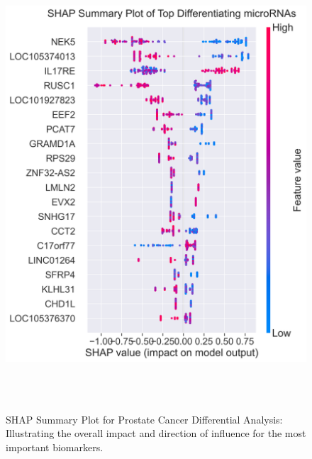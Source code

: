 \documentclass[journal]{IEEEtran}
\begin{document}
\begin{figure}[htbp]
 \centering
 \includegraphics[width=0.9\linewidth]{prostate_cancer_figures/differential/shap_summary_plot_c_and_healthy.png}
 \caption{SHAP Summary Plot for Prostate Cancer Differential Analysis: Illustrating the overall impact and direction of influence for the most important biomarkers.}
 \label{fig:prostate_shap_summary}
\end{figure}
\end{document}
